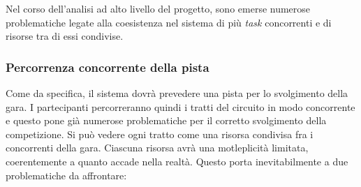 Nel corso dell'analisi ad alto livello del progetto, sono emerse numerose problematiche legate alla coesistenza nel 
sistema di pi\`{u} \emph{task} concorrenti e di risorse tra di essi condivise. \\
\subsubsection{Percorrenza concorrente della pista}
Come da specifica, il sistema dovr\`{a} prevedere una pista per lo svolgimento della gara. I partecipanti percorreranno quindi i tratti del circuito in modo concorrente e questo pone gi\`{a} numerose problematiche per il corretto svolgimento della competizione.
Si pu\`{o} vedere ogni tratto come una risorsa condivisa fra i concorrenti della gara. Ciascuna risorsa avr\`{a} una motleplicit\`{a} limitata, coerentemente a quanto accade nella realt\`{a}. Questo porta inevitabilmente a due problematiche da affrontare:
